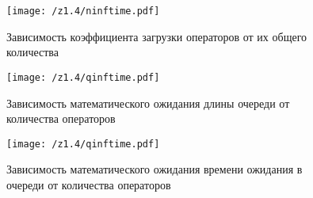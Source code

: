 \begin{figure}[H]
	\begin{center}
        \texttt{[image: /z1.4/ninftime.pdf]}
        \caption{Зависимость коэффициента загрузки операторов от их общего количества}
	\end{center}
\end{figure}


\begin{figure}[H]
	\begin{center}
        \texttt{[image: /z1.4/qinftime.pdf]}
        \caption{Зависимость математического ожидания длины очереди от количества операторов}
	\end{center}
\end{figure}


\begin{figure}[H]
	\begin{center}
        \texttt{[image: /z1.4/qinftime.pdf]}
        \caption{Зависимость математического ожидания времени ожидания в очереди от количества операторов}
	\end{center}
\end{figure}